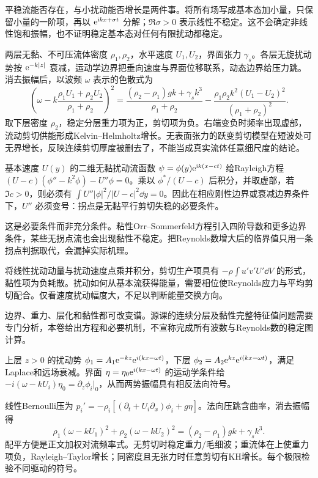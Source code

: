 平稳流能否存在，与小扰动能否增长是两件事。将所有场写成基本态加小量，只保留小量的一阶项，再以 $\mathrm e^{\mathrm i kx+\sigma t}$ 分解；$\Re\sigma>0$ 表示线性不稳定。这不会确定非线性饱和振幅，也不证明稳定基本态对任何有限扰动都稳定。

两层无黏、不可压流体密度 $\rho_1,\rho_2$，水平速度 $U_1,U_2$，界面张力 $\gamma_s$。各层无旋扰动势按 $\mathrm e^{-k|z|}$ 衰减，运动学边界把垂向速度与界面位移联系，动态边界给压力跳。消去振幅后，以波频 $\omega$ 表示的色散式为
\[
\left(\omega-k\frac{\rho_1U_1+\rho_2U_2}{\rho_1+\rho_2}\right)^2
=\frac{(\rho_2-\rho_1)gk+\gamma_s k^3}{\rho_1+\rho_2}
-\frac{\rho_1\rho_2k^2(U_1-U_2)^2}{(\rho_1+\rho_2)^2}.
\]
取下层密度 $\rho_2$，稳定分层重力项为正，剪切项为负。右端变负时频率出现虚部，流动剪切供能形成Kelvin--Helmholtz增长。无表面张力的跃变剪切模型在短波处可无界增长，反映连续剪切厚度被删去了，不能当成真实流体任意细尺度的结论。

基本速度 $U(y)$ 的二维无黏扰动流函数 $\psi=\phi(y)\mathrm e^{\mathrm i k(x-ct)}$ 给Rayleigh方程 $(U-c)(\phi''-k^2\phi)-U''\phi=0$。乘以 $\phi^*/(U-c)$ 后积分，并取虚部，若 $\Im c>0$，则必须有 $\int U''|\phi|^2/|U-c|^2\dd y=0$。因此在相应刚性边界或衰减边界条件下，$U''$ 必须变号：拐点是无黏平行剪切失稳的必要条件。

这是必要条件而非充分条件。粘性Orr--Sommerfeld方程引入四阶导数和更多边界条件，某些无拐点流也会出现黏性不稳定。把Reynolds数增大后的临界值只用一条拐点判据取代，会漏掉实际机理。

将线性扰动动量与扰动速度点乘并积分，剪切生产项具有 $-\rho\int u'v'U'\dd V$ 的形式，黏性项为负耗散。扰动如何从基本流获得能量，需要相位使Reynolds应力与平均剪切配合。仅看速度扰动幅度大，不足以判断能量交换方向。

边界、重力、层化和黏性都可改变谱。源课的连续分层及黏性完整特征值问题需要专门分析，本卷给出方程和必要机制，不宣称完成所有波数与Reynolds数的稳定图计算。

上层 $z>0$ 的扰动势 $\phi_1=A_1\mathrm e^{-kz}\mathrm e^{i(kx-\omega t)}$，下层 $\phi_2=A_2\mathrm e^{kz}\mathrm e^{i(kx-\omega t)}$，满足Laplace和远场衰减。界面 $\eta=\eta_0\mathrm e^{i(kx-\omega t)}$ 的运动学条件给 $-i(\omega-kU_i)\eta_0=\partial_z\phi_i|_0$，从而两势振幅具有相反法向符号。

线性Bernoulli压为 $p_i'=-\rho_i[(\partial_t+U_i\partial_x)\phi_i+g\eta]$。法向压跳含曲率，消去振幅得
\[
\rho_1(\omega-kU_1)^2+\rho_2(\omega-kU_2)^2
=(\rho_2-\rho_1)gk+\gamma_sk^3.
\]
配平方便是正文加权对流频率式。无剪切时稳定重力/毛细波；重流体在上使重力项负，Rayleigh--Taylor增长；同密度且无张力时任意剪切有KH增长。每个极限检验不同驱动的符号。

